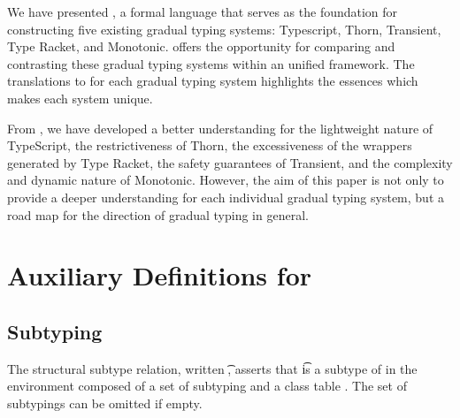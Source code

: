 \documentclass[a4paper,USenglish]{tex/lipics-v2016}
\begin{document}
We have presented \kafka, a formal language that serves as the foundation
for constructing five existing gradual typing systems: Typescript, Thorn,
Transient, Type Racket, and Monotonic. \kafka offers the opportunity for
comparing and contrasting these gradual typing systems within an unified
framework. The translations to \kafka for each gradual typing system
highlights the essences which makes each system unique.

From \kafka, we have developed a better understanding for the lightweight
nature of TypeScript, the restrictiveness of Thorn, the excessiveness of the
wrappers generated by Type Racket, the safety guarantees of Transient, and
the complexity and dynamic nature of Monotonic.  However, the aim of this
paper is not only to provide a deeper understanding for each individual
gradual typing system, but a road map for the direction of gradual typing in
general.


\clearpage




\appendix
\section{Auxiliary Definitions for \kafka}%

\subsection{Subtyping}

The structural subtype relation, written \StrSub\M\K\t\tp, asserts that \t
is a subtype of \tp in the environment composed of a set of subtyping \M and
a class table \K.   The set of subtypings can be omitted if empty.

~\\

\begin{mathpar}


\end{mathpar}
\end{document}
